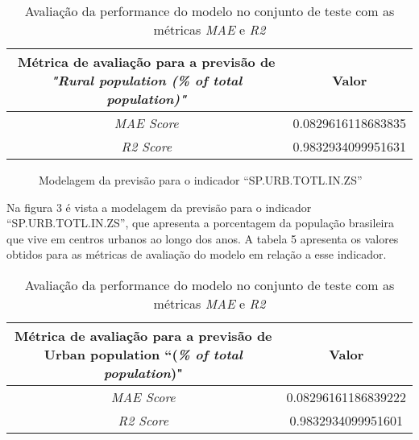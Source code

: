 \begin{table}[h]
    \centering
    \begin{tabular}{|c|c|}
        \hline
        \multicolumn{1}{|p{4cm}|}{Métrica de avaliação para a previsão de \emph{"Rural population (\% of total population)"}} & Valor \\
        \hline
        \emph{MAE Score} & 0.0829616118683835 \\
        \hline
        \emph{R2 Score} & 0.9832934099951631 \\
        \hline 
    \end{tabular}
    \caption{Avaliação da performance do modelo no conjunto de teste com as métricas \emph{MAE} e \emph{R2}}
\end{table}

\begin{figure}[h]
    \caption{Modelagem da previsão para o indicador “SP.URB.TOTL.IN.ZS”}
\end{figure}

Na figura 3 é vista a modelagem da previsão para o indicador “SP.URB.TOTL.IN.ZS”, que apresenta a porcentagem da 
população brasileira que vive em centros urbanos ao longo dos anos. A tabela 5 apresenta os valores obtidos 
para as métricas de avaliação do modelo em relação a esse indicador.

\begin{table}[h!]
    \centering
    \begin{tabular}{|c|c|}
        \hline
        \multicolumn{1}{|p{4cm}|}{Métrica de avaliação para a previsão de Urban population ``(\emph{\% of total population})"} & Valor \\
        \hline
        \emph{MAE Score} & 0.08296161186839222 \\
        \hline 
        \emph{R2 Score} & 0.9832934099951601 \\
        \hline
    \end{tabular}
    \caption{Avaliação da performance do modelo no conjunto de teste com as métricas \emph{MAE} e \emph{R2}}    
\end{table}